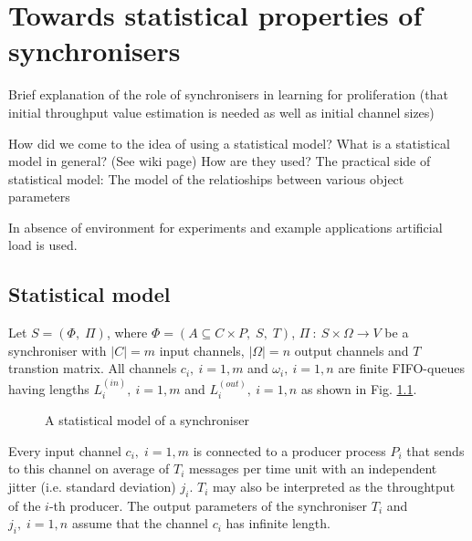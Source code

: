 \chapter{Towards statistical properties of synchronisers}
Brief explanation of the role of synchronisers in learning for proliferation (that initial throughput value estimation is needed as well as initial channel sizes)

How did we come to the idea of using a statistical model?
What is a statistical model in general? (See wiki page) How are they used?
The practical side of statistical model: The model of the relatioships between various object parameters
 
In absence of environment for experiments and example applications artificial load is used.


\section{Statistical model}
Let $S = (\Phi, \; \Pi)$, where $\Phi = (A \subseteq C \times P, \; S, \; T)$, $\Pi \: : \: S \times \Omega \to V$ be a synchroniser with $|C| = m$ input channels, $|\Omega| = n$ output channels and $T$ transtion matrix. All channels $c_{i}, \: i = 1,m$ and $\omega_{i}, \: i=1,n$ are finite FIFO-queues having lengths $L^{(in)}_{i}, \: i = 1,m$ and $L^{(out)}_{i}, \: i=1,n$ as shown in Fig. \ref{fig:stat_mod}.

  \begin{figure}[h] %
  \scalebox{0.8}{
    
  }
  \caption{A statistical model of a synchroniser}
  \label{fig:stat_mod}
  \end{figure}

Every input channel $c_{i}, \; i = 1,m$ is connected to a producer process $P_{i}$ that sends to this channel on average of $T_{i}$ messages per time unit with an independent jitter (i.e. standard deviation) $j_{i}$. $T_{i}$ may also be interpreted as the throughtput of the $i$-th producer. The output parameters of the synchroniser $T_{i}$ and $j_{i}, \; i=1,n$ assume that the channel $c_{i}$ has infinite length.

